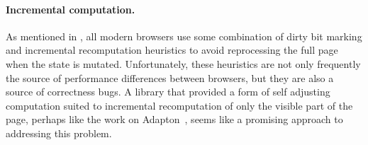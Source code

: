 \paragraph{Incremental computation.} As mentioned in ,
all modern browsers use some combination of dirty bit marking and incremental
recomputation heuristics to avoid reprocessing the full page when
the state is mutated.
Unfortunately, these heuristics are not only frequently the source of
performance differences between browsers, but they are also a source of
correctness bugs.
A library that provided a form of self adjusting computation suited to
incremental recomputation of only the visible part of the page, perhaps
like the work on Adapton~\cite{adapton}, seems like a promising
approach to addressing this problem.

